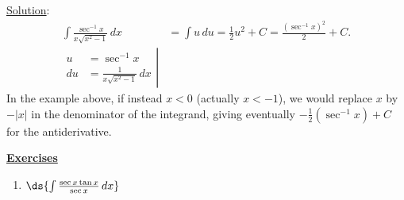 \underline{Solution}:
\begin{align*}
\int\frac{\sec^{-1}x}{x\sqrt{x^2-1}}\,dx&=\int u\,du
  =\frac12u^2+C=\frac{\left(\sec^{-1}x\right)^2}2+C.\\
\left.\begin{aligned}
u&=\sec^{-1}x\\
du&=\frac1{x\sqrt{x^2-1}}\,dx\end{aligned}\right|&\end{align*}
\eex
In the example above, if instead $x<0$ (actually $x<-1$), 
we would replace $x$ by $-|x|$ in the denominator of the integrand,
giving eventually $-\frac12(\sec^{-1}x)+C$ for the antiderivative.


\newpage
\begin{center}
\underline{\Large{\bf Exercises}}\end{center}

\begin{multicols}{2}
\begin{enumerate}
\item $\ds{\int\frac{\sec x\tan x}{\sec x}\,dx}$
      \label{IntOfSecXTanX/SecXForFun}
\end{enumerate}
\end{multicols}

\newpage
